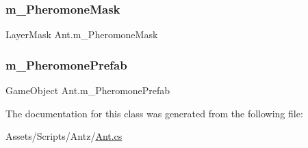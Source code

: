 \subsubsection{\texorpdfstring{m\_PheromoneMask}{m\_PheromoneMask}}
{\footnotesize\ttfamily Layer\+Mask Ant.\+m\+\_\+\+Pheromone\+Mask}

\mbox{\label{class_ant_af45c9cb83741452ab3d9b53dd805b0d4}} 
\subsubsection{\texorpdfstring{m\_PheromonePrefab}{m\_PheromonePrefab}}
{\footnotesize\ttfamily Game\+Object Ant.\+m\+\_\+\+Pheromone\+Prefab}



The documentation for this class was generated from the following file\+:\begin{DoxyCompactItemize}
\item 
Assets/\+Scripts/\+Antz/\mbox{\hyperlink{_ant_8cs}{Ant.\+cs}}\end{DoxyCompactItemize}

